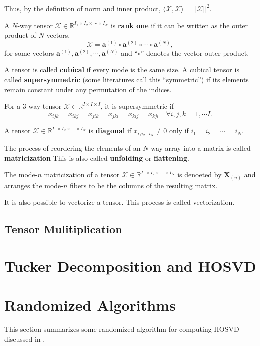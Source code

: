 \documentclass[final]{elsarticle}
\begin{document}
Thus, by the definition of norm and inner product,
$\langle\boldsymbol{\mathscr{X}},\boldsymbol{\mathscr{X}}\rangle=||\boldsymbol{\mathscr{X}}||^2$.
\begin{defn}
    A $N$-way tensor $\boldsymbol{\mathscr{X}}\in\mathbb{R}^{I_1\times I_2\times\cdots\times I_N}$ is \textbf{rank one} if it can
    be written as the outer product of $N$ vectors,
    \begin{equation}
        \boldsymbol{\mathscr{X}} = \mathbf{a}^{(1)}\circ\mathbf{a}^{(2)}\circ\cdots\circ\mathbf{a}^{(N)},
    \end{equation}
    for some vectors $\mathbf{a}^{(1)},\mathbf{a}^{(2)},\cdots,\mathbf{a}^{(N)}$ and ``$\circ$'' denotes the vector outer product.
\end{defn}
\begin{defn}
    A tensor is called \textbf{cubical} if every mode is the same size. A cubical tensor is called \textbf{supersymmetric}
    (some literatures call this ``symmetric'') if its elements remain constant under any permutation of the indices.
\end{defn}
For a $3$-way tensor $\boldsymbol{\mathscr{X}}\in\mathbb{R}^{I\times I\times I}$, it is supersymmetric if
\[
    x_{ijk} = x_{ikj} = x_{jik} = x_{jki} = x_{kij} = x_{kji} \quad \forall i,j,k=1,\cdots I.
\]
\begin{defn}
    A tensor $\boldsymbol{\mathscr{X}}\in\mathbb{R}^{I_1\times I_2\times\cdots\times I_N}$ is \textbf{diagonal}
    if $x_{i_1i_2\cdots i_N}\neq 0$ only if $i_1=i_2=\cdots=i_N$. 
\end{defn}
\begin{defn}[Matricization]
    The process of reordering the elements of an $N$-way array into a matrix is called \textbf{matricization}
This is also called \textbf{unfolding} or \textbf{flattening}.
\end{defn}
The mode-$n$ matricization of a tensor $\boldsymbol{\mathscr{X}}\in\mathbb{R}^{I_1\times I_2\times\cdots\times I_N}$
is denoeted by $\mathbf{X}_{(n)}$ and arranges the mode-$n$ fibers to be the columns of the resulting matrix.
\begin{rmk}
    It is also possible to vectorize a tensor. This process is called vectorization.
\end{rmk}
\subsection{Tensor Mulitiplication}
\section{Tucker Decomposition and HOSVD}
\section{Randomized Algorithms}
\noindent This section summarizes some randomized algorithm for computing HOSVD discussed in \cite{9350569}.


\end{document}
